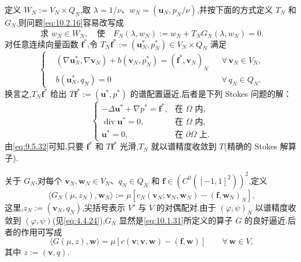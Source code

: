定义 \(W_N:=V_N\times Q_N\),取 \(\lambda=1/\nu\)、\(w_N=(\boldsymbol{u}_N,p_N/\nu)\),并按下面的方式定义 \(T_N\) 和 \(G_N\),则问题\eqref{eq:10.2.16}容易改写成
\[
  \text{求 }w_N\in W_N,\quad\text{使}\quad
    F_N(\lambda,w_N):=w_N+T_NG_N(\lambda,w_N)=0.
\]
对任意连续向量函数 \(\boldsymbol{f}^*\),令 \(T_N\boldsymbol{f}^*:=(\boldsymbol{u}_N^*,p_N^*)\in V_N\times Q_N\) 满足
\begin{equation}\label{eq:10.2.17}
  \left\{
  \begin{aligned}
    &(\nabla\boldsymbol{u}_N^*,\nabla\boldsymbol{v}_N)+b(\boldsymbol{v}_N,p_N^*)
       =(\boldsymbol{f}^*,\boldsymbol{v}_N)_N&&\forall\,\boldsymbol{v}_N\in V_N,\\
    &b(\boldsymbol{u}_N^*,q_N)=0&&\forall\,q_N\in Q_N .
  \end{aligned}
  \right.
\end{equation}
换言之,\(T_N\boldsymbol{f}^*\) 给出 \(T\boldsymbol{f}^*:=(\boldsymbol{u}^*,p^*)\) 的谱配置逼近,后者是下列 Stokes 问题的解：
\[
  \begin{cases}
    -\Delta\boldsymbol{u}^*+\nabla p^*=\boldsymbol{f}^*,&\text{在 }\Omega\text{ 内},\\
    \operatorname{div}\boldsymbol{u}^*=0,&\text{在 }\Omega\text{ 内},\\
    \boldsymbol{u}^*=0,&\text{在 }\partial\Omega\text{ 上}.
  \end{cases}
\]
由\eqref{eq:9.5.32}可知,只要 \(\boldsymbol{f}^*\) 和 \(T\boldsymbol{f}^*\) 光滑,\(T_N\) 就以谱精度收敛到 \(T\)(精确的 Stokes 解算子).

关于 \(G_N\),对每个 \(\boldsymbol{v}_N,\boldsymbol{w}_N\in V_N\)、\(q_N\in Q_N\) 和 \(\boldsymbol{f}\in(C^0([-1,1]^2))^2\),定义
\begin{equation}\label{eq:10.2.18}
  \langle G_N(\mu,z_N),\boldsymbol{w}_N\rangle
    :=\mu[c_N(\boldsymbol{v}_N;\boldsymbol{v}_N,\boldsymbol{w}_N)-(\boldsymbol{f},\boldsymbol{w}_N)_N],
\end{equation}
这里,\(z_N:=(\boldsymbol{v}_N,q_N)\),尖括号表示 \(V'\) 与 \(V\) 的对偶配对.由于 \((\varphi,\psi)_N\) 以谱精度收敛到 \((\varphi,\psi)\)(见\eqref{eq:4.4.24}),\(G_N\) 显然是\eqref{eq:10.1.31}所定义的算子 \(G\) 的良好逼近.后者的作用可写成
\begin{equation}\label{eq:10.2.19}
  \langle G(\mu,z),\boldsymbol{w}\rangle
    =\mu[c(\boldsymbol{v};\boldsymbol{v},\boldsymbol{w})-(\boldsymbol{f},\boldsymbol{w})]
         \qquad\forall\,\boldsymbol{w}\in V,
\end{equation}
其中 \(z:=(\boldsymbol{v},q)\).

